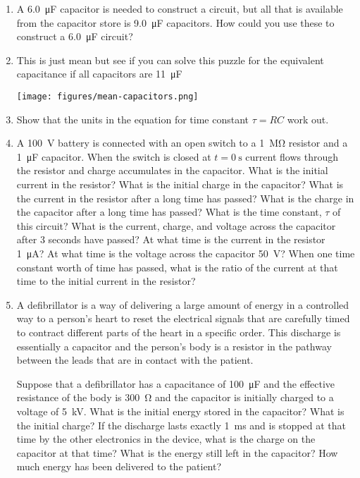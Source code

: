 \begin{enumerate}
\item
A \SI{6.0}{\micro\farad} capacitor is needed to construct a circuit, but all that is available from the capacitor store is \SI{9.0}{\micro\farad} capacitors. How could you use these to construct a \SI{6.0}{\micro\farad} circuit?

\item
This is just mean but see if you can solve this puzzle for the equivalent capacitance if all capacitors are \SI{11}{\micro\farad}

\texttt{[image: figures/mean-capacitors.png]}

\item
Show that the units in the equation for time constant $\tau=RC$ work out.

\item
A \SI{100}{\volt} battery is connected with an open switch to a \SI{1}{\mega\ohm} resistor and a \SI{1}{\micro\farad} capacitor. When the switch is closed at $t=\SI{0}{\second}$ current flows through the resistor and charge accumulates in the capacitor. What is the initial current in the resistor? What is the initial charge in the capacitor? What is the current in the resistor after a long time has passed? What is the charge in the capacitor after a long time has passed? What is the time constant, $\tau$ of this circuit? What is the current, charge, and voltage across the capacitor after 3 seconds have passed? At what time is the current in the resistor \SI{1}{\micro\ampere}? At what time is the voltage across the capacitor \SI{50}{\volt}? When one time constant worth of time has passed, what is the ratio of the current at that time to the initial current in the resistor?

\clearpage
\item
A defibrillator is a way of delivering a large amount of energy in a controlled way to a person's heart to reset the electrical signals that are carefully timed to contract different parts of the heart in a specific order. This discharge is essentially a capacitor and the person's body is a resistor in the pathway between the leads that are in contact with the patient. 

Suppose that a defibrillator has a capacitance of \SI{100}{\micro\farad} and the effective resistance of the body is \SI{300}{\ohm} and the capacitor is initially charged to a voltage of \SI{5}{\kilo\volt}. What is the initial energy stored in the capacitor? What is the initial charge? If the discharge lasts exactly \SI{1}{\milli\second} and is stopped at that time by the other electronics in the device, what is the charge on the capacitor at that time? What is the energy still left in the capacitor? How much energy has been delivered to the patient? 


\end{enumerate}
